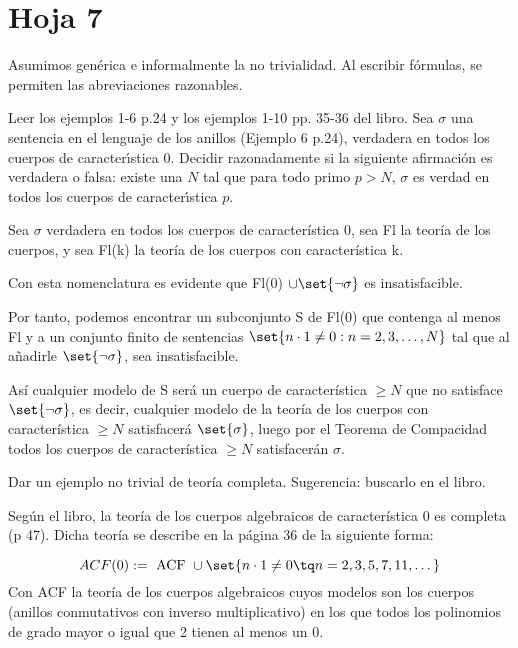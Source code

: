 \section{Hoja 7}

Asumimos genérica e informalmente la no trivialidad. Al escribir fórmulas, se permiten
las abreviaciones razonables.

\begin{problem}
Leer los ejemplos 1-6 p.24 y los ejemplos 1-10  pp. 35-36 del libro. Sea $\sigma$
una sentencia en el lenguaje de los anillos (Ejemplo 6 p.24), verdadera en todos los
cuerpos de caracter\'{\i}stica 0. Decidir razonadamente si la siguiente afirmaci\'on
es verdadera o falsa: existe una $N$ tal que para todo primo $p > N$, $\sigma$ es verdad
en todos los cuerpos de caracter\'{\i}stica $p$.
\solution


Sea $\sigma$ verdadera en todos los cuerpos de característica 0, sea Fl la teoría de los cuerpos, y sea Fl(k) la teoría de los cuerpos con característica k.

Con esta nomenclatura es evidente que Fl(0) $\cup \set{\neg \sigma}$ es insatisfacible.

Por tanto, podemos encontrar un subconjunto S de Fl(0) que contenga al menos Fl y a un conjunto finito de sentencias $\set{n \cdot 1 \neq 0 : n=2,3,\dots, N}$ tal que al añadirle $\set{\neg \sigma}$, sea insatisfacible.

Así cualquier modelo de S será un cuerpo de característica $\geq N$ que no satisface $\set{\neg \sigma}$, es decir, cualquier modelo de la teoría de los cuerpos con característica $\geq N$ satisfacerá $\set{ \sigma}$, luego por el Teorema de Compacidad todos los cuerpos de característica $\geq N$ satisfacerán $\sigma$.

\end{problem}

\begin{problem}
Dar un ejemplo no trivial de teoría completa. Sugerencia: buscarlo en el libro.
\solution

Según el libro, la teoría de los cuerpos algebraicos de característica 0 es completa (p 47).
Dicha teoría se describe en la página 36 de la siguiente forma:

\[ ACF(0) := \text{ ACF } \cup \set{n \cdot 1 \neq 0 \tq n = 2,3,5,7,11, \dots} \]
Con ACF la teoría de los cuerpos algebraicos cuyos modelos son los cuerpos (anillos conmutativos con inverso multiplicativo) en los que todos los polinomios de grado mayor o igual que 2 tienen al menos un 0.
\end{problem}

